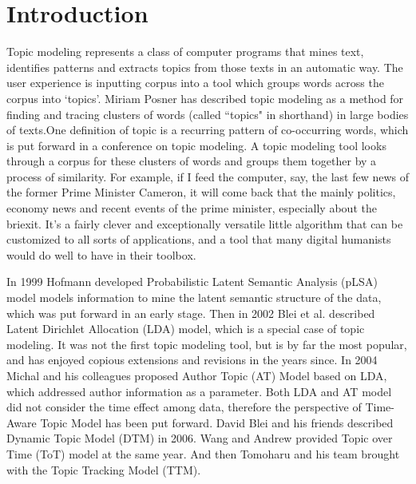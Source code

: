 \chapter{Introduction}
\label{chapterlabel1}




Topic modeling represents a class of computer programs that mines text, identifies patterns and extracts topics from those texts in an automatic way. The user experience is inputting corpus into a tool which groups words across the corpus into ‘topics’. Miriam Posner \cite{posner2012very} has described topic modeling as a method for finding and tracing clusters of words (called ``topics" in shorthand) in large bodies of texts.One definition of topic is a recurring pattern of co-occurring words, which is put forward in a conference on topic modeling. A topic modeling tool looks through a corpus for these clusters of words and groups them together by a process of similarity. For example, if I feed the computer, say, the last few news of the former Prime Minister Cameron, it will come back that the mainly politics, economy news and recent events  of the prime minister, especially about the briexit. It’s a fairly clever and exceptionally versatile little algorithm that can be customized to all sorts of applications, and a tool that many digital humanists would do well to have in their toolbox.

In 1999 Hofmann \cite{hofmann1999probabilistic} developed Probabilistic Latent Semantic Analysis (pLSA) model models information to mine the latent semantic structure of the data, which was put forward in an early stage. Then in 2002 Blei et al. \cite{blei2003latent} described Latent Dirichlet Allocation (LDA) model, which is a special case of topic modeling. It was not the first topic modeling tool, but is by far the most popular, and has enjoyed copious extensions and revisions in the years since. In 2004 Michal and his colleagues proposed Author Topic (AT) Model \cite{rosen2004author} based on LDA, which addressed author information as a parameter. Both LDA and AT model did not consider the time effect among data, therefore the perspective of Time-Aware Topic Model has been put forward. David Blei \cite{blei2006dynamic} and his friends described Dynamic Topic Model (DTM) in 2006. Wang and Andrew \cite{wang2006topics} provided Topic over Time (ToT) model at the same year. And then Tomoharu \cite{iwata2009topic} and his team brought with the Topic Tracking Model (TTM).

